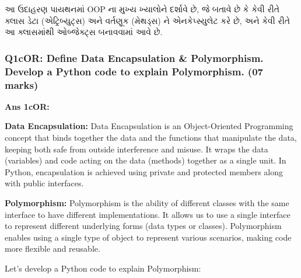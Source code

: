 આ ઉદાહરણ પાયથનમાં OOP ના મુખ્ય ખ્યાલોને દર્શાવે છે, જે બતાવે છે કે કેવી રીતે ક્લાસ ડેટા
(એટ્રિબ્યુટ્સ) અને વર્તણૂક (મેથડ્સ) ને એનકેપ્સ્યુલેટ કરે છે, અને કેવી રીતે આ ક્લાસમાંથી ઓબ્જેક્ટ્સ
બનાવવામાં આવે છે.

\begin{Shaded}
\begin{Highlighting}[]
\NormalTok{    \}}
\end{Highlighting}
\end{Shaded}

\hypertarget{q1cor-define-data-encapsulation-polymorphism.-develop-a-python-code-to-explain-polymorphism.-07-marks}{%
\subsubsection{Q1cOR: Define Data Encapsulation \& Polymorphism. Develop
a Python code to explain Polymorphism. (07
marks)}\label{q1cor-define-data-encapsulation-polymorphism.-develop-a-python-code-to-explain-polymorphism.-07-marks}}

\textbf{Ans 1cOR:}

\textbf{Data Encapsulation:} Data Encapsulation is an Object-Oriented
Programming concept that binds together the data and the functions that
manipulate the data, keeping both safe from outside interference and
misuse. It wraps the data (variables) and code acting on the data
(methods) together as a single unit. In Python, encapsulation is
achieved using private and protected members along with public
interfaces.

\textbf{Polymorphism:} Polymorphism is the ability of different classes
with the same interface to have different implementations. It allows us
to use a single interface to represent different underlying forms (data
types or classes). Polymorphism enables using a single type of object to
represent various scenarios, making code more flexible and reusable.

Let's develop a Python code to explain Polymorphism:

